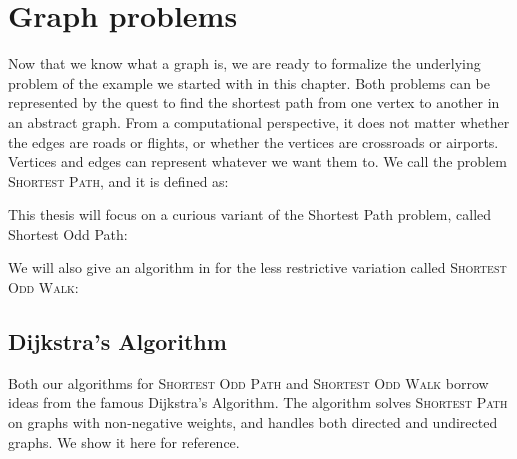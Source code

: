 \section{Graph problems}
\label{section:graph-problems}

Now that we know what a graph is, we are ready to formalize the underlying problem of the example we started with in this chapter. Both problems can be represented by the quest to find the shortest path from one vertex to another in an abstract graph. From a computational perspective, it does not matter whether the edges are roads or flights, or whether the vertices are crossroads or airports. Vertices and edges can represent whatever we want them to. We call the problem \textsc{Shortest Path}, and it is defined as:

\noindent{}

This thesis will focus on a curious variant of the Shortest Path problem, called Shortest Odd Path:

\noindent{}

We will also give an algorithm in  for the less restrictive variation called \textsc{Shortest Odd Walk}:

\noindent{}

\subsection*{Dijkstra's Algorithm}
\label{algorithm:dijkstras-algorithm}
Both our algorithms for \textsc{Shortest Odd Path} and \textsc{Shortest Odd Walk} borrow ideas from the famous Dijkstra's Algorithm. The algorithm solves \textsc{Shortest Path} on graphs with non-negative weights, and handles both directed and undirected graphs. We show it here for reference.

